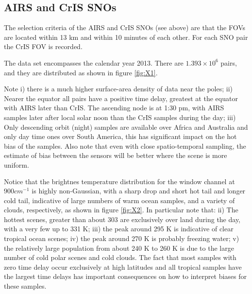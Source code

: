 \documentclass[twocolumn,10pt]{article}
\begin{document}
\subsection{AIRS and CrIS SNOs}

The selection criteria of the AIRS and CrIS SNOs (see above) are that the FOVs are located
within 13 km and within 10 minutes of each other. For each SNO pair the CrIS FOV is recorded. 

The data set encompasses the calendar year 2013. There are $1.393\times 10^{6}$ pairs, and they are distributed as shown in figure \ref{fig:X1}.

Note i) there is a much higher surface-area density of data near the poles; 
ii) Nearer the equator all pairs have a positive time delay, greatest at the equator with AIRS later than CrIS. The ascending node is at 1:30 pm, with
AIRS samples later after local solar noon than the CrIS samples during the day; 
iii) Only descending orbit (night) samples are available over Africa and Australia and only day time ones over South America, this has significant impact on the hot bias of the samples. Also note that even with close spatio-temporal sampling, the estimate of bias between the sensors will be better where the scene is more uniform.


Notice that the brightnes temperature distribution for the window channel at $900 cm^{-1}$ is highly non-Gaussian, with a sharp drop and short hot tail and longer cold tail, indicative of large numbers of warm ocean samples, and a variety of clouds, respectively, as shown in figure \ref{fig:X2}. In particular note that: 
ii) The hottest scenes, greater than about 303 are exclusively over land during the day, with a very few up to 331 K; 
iii) the peak around 295 K is indicative of clear tropical ocean scenes; 
iv) the peak around 270 K is probably freezing water; 
v) the relatively large population from about 240 K to 260 K is due to the large number of cold polar scenes and cold clouds. The fact that most samples with zero time delay occur exclusively at high latitudes and all tropical samples have the largest time delays has important consequences on how to interpret biases for these samples.
\end{document}
